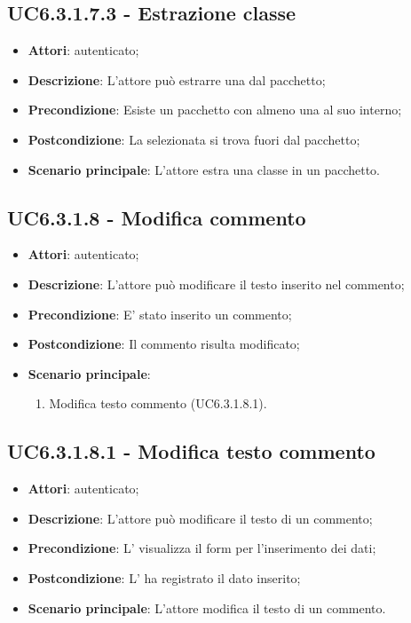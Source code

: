 \subsection{UC6.3.1.7.3 - Estrazione classe}
\label{ssec:UC6.3.1.7.3}
\begin{itemize}
\item \textbf{Attori}:  autenticato;
\item \textbf{Descrizione}: L'attore può estrarre una  dal pacchetto;
\item \textbf{Precondizione}: Esiste un pacchetto con almeno una  al suo interno;
\item \textbf{Postcondizione}: La  selezionata si trova fuori dal pacchetto;
\item \textbf{Scenario principale}: L'attore estra una classe in un pacchetto.
\end{itemize}
\subsection{UC6.3.1.8 - Modifica commento}
\label{ssec:UC6.3.1.8}
\begin{itemize}
\item \textbf{Attori}:  autenticato;
\item \textbf{Descrizione}: L'attore può modificare il testo inserito nel commento;
\item \textbf{Precondizione}: E' stato inserito un commento;
\item \textbf{Postcondizione}: Il commento risulta modificato;
\item \textbf{Scenario principale}: \begin{enumerate}\item Modifica testo commento (UC6.3.1.8.1).
 \end{enumerate}
\end{itemize}
\subsection{UC6.3.1.8.1 - Modifica testo commento}
\label{ssec:UC6.3.1.8.1}
\begin{itemize}
\item \textbf{Attori}:  autenticato;
\item \textbf{Descrizione}: L'attore può modificare il testo di un commento;
\item \textbf{Precondizione}: L' visualizza il form per l'inserimento dei dati;
\item \textbf{Postcondizione}: L' ha registrato il dato inserito;
\item \textbf{Scenario principale}: L'attore modifica il testo di un commento.
\end{itemize}
